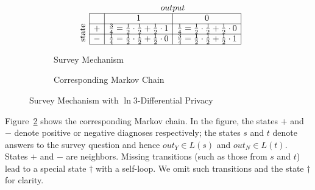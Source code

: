 \begin{figure}
  \centering
  \begin{subfigure}{.48\columnwidth}
      \[
      \begin{array}{c|c|c|c|}
        \multicolumn{2}{c}{} &
        \multicolumn{2}{c}{output}
        \\
        \cline{2-4}
        &  & 1 & 0 \\
        \cline{2-4}
        \multirow{2}*{\rotatebox{90}{state}} 
        &
        + & \frac{3}{4} = \frac{1}{2} \cdot \frac{1}{2} + \frac{1}{2} \cdot 1
          & \frac{1}{4} = \frac{1}{2} \cdot \frac{1}{2} + \frac{1}{2} \cdot 0
        \\
        \cline{2-4}
        &
        - & \frac{1}{4} = \frac{1}{2} \cdot \frac{1}{2} + \frac{1}{2} \cdot 0
          & \frac{3}{4} = \frac{1}{2} \cdot \frac{1}{2} + \frac{1}{2} \cdot 1
        \\
        \cline{2-4}
      \end{array}
      \]
    \caption{Survey Mechanism}
    \label{figure:2-dp-table}
  \end{subfigure}
  \hspace{.05\columnwidth}
  \begin{subfigure}{.40\columnwidth}
    \caption{Corresponding Markov Chain}
    \label{figure:2-dp-mdp}
  \end{subfigure}
  \caption{Survey Mechanism with $\ln 3$-Differential Privacy}
  \label{figure:2-dp}
\end{figure}

Figure~\ref{figure:2-dp-mdp} shows the corresponding Markov chain.
In the figure, the states
$+$ and $-$ denote positive or negative diagnoses 
respectively; the states $s$ and $t$ denote answers to the survey
question and hence $\mathit{out}_Y \in L (s)$ and $\mathit{out}_N
\in L (t)$.
States $+$ and $-$ are neighbors.
Missing transitions (such as those from $s$ and $t$) lead
to a special state $\dagger$ with a self-loop. We omit such transitions
and the state $\dagger$ for clarity.


